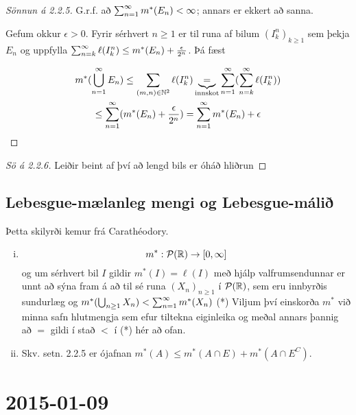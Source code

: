 \documentclass[12pt]{book} \usepackage[utf8]{inputenc}
\newcommand{\cP}{\mathcal{P}} \newcommand{\cF}{\mathcal{F}}
\begin{document}
\begin{proof}[Sönnun á 2.2.5]
  G.r.f. að $\sum_{n = 1}^{\infty} m^*(E_n) < \infty$; annars er ekkert að sanna.

  Gefum okkur $\epsilon > 0$. Fyrir sérhvert $n \geq 1$ er til runa af
  bilum $(I^n_k)_{k \geq 1}$ sem þekja $E_n$ og uppfylla
  $\sum_{n = {k}}^{\infty} \ell(I^n_k) \leq m^*(E_n) + \frac{\epsilon}{2^n}$. Þá fæst

      \begin{gather*}
        m^*(\bigcup_{n=1}^{\infty} E_n) \leq \sum_{(m,n) \in \mathbb{N}^2}
        \ell(I_k^n)
        \underbrace{=}_{\text{innskot}} \sum_{n = 1}^{\infty} (\sum_{n = {k}}^{\infty} \ell(I^n_k))\\
        \leq \sum_{n = 1}^{\infty} (m^*(E_n) + \frac{\epsilon}{2^n}) = \sum_{n = 1}^{\infty} m^*(E_n) +
        \epsilon
      \end{gather*}
        
    \end{proof}
    \begin{proof}[Sö á 2.2.6]
      Leiðir beint af því að lengd bils er óháð hliðrun
    \end{proof}

    \section{Lebesgue-mælanleg mengi og Lebesgue-málið}

    Þetta skilyrði kemur frá Carathéodory.

    \begin{ath}
      \begin{enumerate}[(i)]
      \item \[m^*: \cP(\R) \to [0, \infty] \]
        og um sérhvert bil $I$ gildir $m^{*}(I) = \ell(I)$ með hjálp
        valfrumsendunnar er unnt að sýna fram á að til sé runa
        $(X_n)_{n\geq1}$ í $\cP(\R)$, sem eru innbyrðis sundurlæg og
        $m^*(\bigcup_{n\geq1}X_n) < \sum_{n = 1}^{\infty} m^*(X_n)$ (*) Viljum
        því einskorða $ m^* $ við minna safn hlutmengja sem efur
        tiltekna eiginleika og meðal annars þannig að $=$ gildi í stað
        $<$ í (*) hér að ofan.

      \item Skv. setn. 2.2.5 er ójafnan
        $m^*(A) \leq m^*(A\cap E) + m^*(A \cap E^C)$.
     
      \end{enumerate}
    \end{ath}
\chapter{2015-01-09}
\end{document}
